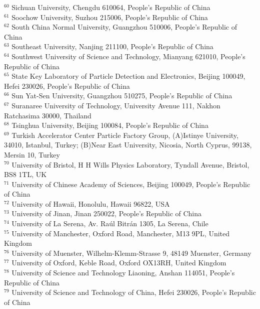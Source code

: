 {{$^{60}$ Sichuan University, Chengdu 610064, People's Republic of China\\
$^{61}$ Soochow University, Suzhou 215006, People's Republic of China\\
$^{62}$ South China Normal University, Guangzhou 510006, People's Republic of China\\
$^{63}$ Southeast University, Nanjing 211100, People's Republic of China\\
$^{64}$ Southwest University of Science and Technology, Mianyang 621010, People's Republic of China\\
$^{65}$ State Key Laboratory of Particle Detection and Electronics, Beijing 100049, Hefei 230026, People's Republic of China\\
$^{66}$ Sun Yat-Sen University, Guangzhou 510275, People's Republic of China\\
$^{67}$ Suranaree University of Technology, University Avenue 111, Nakhon Ratchasima 30000, Thailand\\
$^{68}$ Tsinghua University, Beijing 100084, People's Republic of China\\
$^{69}$ Turkish Accelerator Center Particle Factory Group, (A)Istinye University, 34010, Istanbul, Turkey; (B)Near East University, Nicosia, North Cyprus, 99138, Mersin 10, Turkey\\
$^{70}$ University of Bristol, H H Wills Physics Laboratory, Tyndall Avenue, Bristol, BS8 1TL, UK\\
$^{71}$ University of Chinese Academy of Sciences, Beijing 100049, People's Republic of China\\
$^{72}$ University of Hawaii, Honolulu, Hawaii 96822, USA\\
$^{73}$ University of Jinan, Jinan 250022, People's Republic of China\\
$^{74}$ University of La Serena, Av. Ra\'ul Bitr\'an 1305, La Serena, Chile\\
$^{75}$ University of Manchester, Oxford Road, Manchester, M13 9PL, United Kingdom\\
$^{76}$ University of Muenster, Wilhelm-Klemm-Strasse 9, 48149 Muenster, Germany\\
$^{77}$ University of Oxford, Keble Road, Oxford OX13RH, United Kingdom\\
$^{78}$ University of Science and Technology Liaoning, Anshan 114051, People's Republic of China\\
$^{79}$ University of Science and Technology of China, Hefei 230026, People's Republic of China\\
}}
